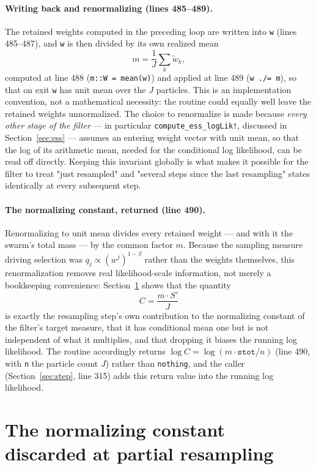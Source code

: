 \documentclass[11pt]{article}
\begin{document}
\paragraph{Writing back and renormalizing (lines 485--489).} The retained
weights computed in the preceding loop are written into \texttt{w}
(lines 485--487), and \texttt{w} is then divided by its own realized mean
\[
m = \frac1J\sum_k \tilde w_k,
\]
computed at line 488 (\texttt{m::W = mean(w)}) and applied at line 489
(\texttt{w ./= m}), so that on exit \texttt{w} has unit mean over the $J$
particles. This is an implementation convention, not a mathematical
necessity: the routine could equally well leave the retained weights
unnormalized. The choice to renormalize is made because \emph{every other
stage of the filter} — in particular \texttt{compute\_ess\_logLik!},
discussed in Section~\ref{sec:ess} — assumes an entering weight vector with
unit mean, so that the log of its arithmetic mean, needed for the
conditional log likelihood, can be read off directly. Keeping this invariant
globally is what makes it possible for the filter to treat "just resampled"
and "several steps since the last resampling" states identically at every
subsequent step.

\paragraph{The normalizing constant, returned (line 490).} Renormalizing to
unit mean divides every retained weight — and with it the swarm's total
mass — by the common factor $m$. Because the sampling measure driving
selection was $q_j\propto (w^j)^{1-\beta}$ rather than the weights
themselves, this renormalization removes real likelihood-scale information,
not merely a bookkeeping convenience: Section~\ref{sec:normconst} shows that
the quantity
\[
C = \frac{m\cdot S'}{J}
\]
is exactly the resampling step's own contribution to the normalizing
constant of the filter's target measure, that it has conditional mean one
but is not independent of what it multiplies, and that dropping it biases
the running log likelihood. The routine accordingly returns $\log C =
\log(m\cdot\texttt{stot}/n)$ (line 490, with \texttt{n} the particle count
$J$) rather than \texttt{nothing}, and the caller
(Section~\ref{sec:step}, line 315) adds this return value into the running
log likelihood.

\section{The normalizing constant discarded at partial resampling}
\label{sec:normconst}
\end{document}
